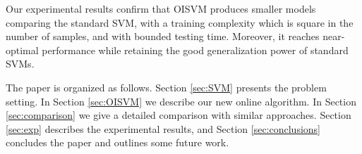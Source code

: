 
Our experimental results confirm that OISVM produces smaller models comparing the
standard SVM, with a training complexity which is square in the number of samples,
and with bounded testing time. Moreover, it reaches near-optimal
performance while retaining the good generalization power of standard SVMs.

The paper is organized as follows. Section \ref{sec:SVM} presents 
the problem setting. In Section \ref{sec:OISVM} we describe our new 
online algorithm. 
In Section \ref{sec:comparison} we give a detailed comparison with
similar approaches. Section \ref{sec:exp}
describes the experimental results, and
Section \ref{sec:conclusions}  concludes the paper and outlines some
future work.
